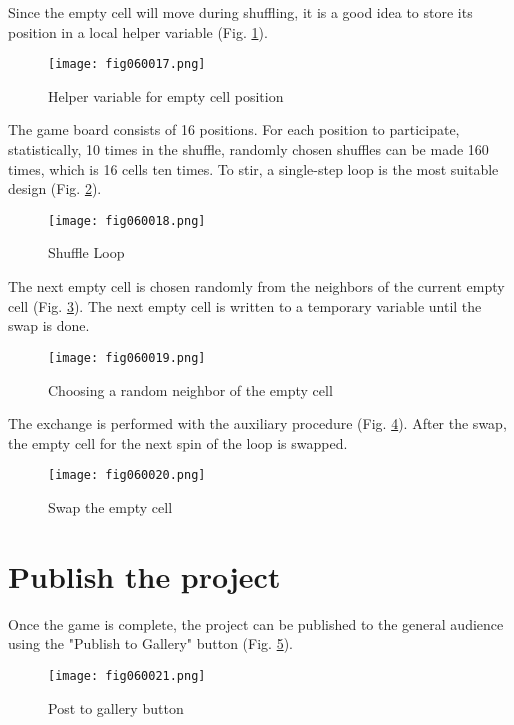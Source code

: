 Since the empty cell will move during shuffling, it is a good idea to store its position in a local helper variable (Fig. \ref{fig060017}).

\begin{figure}[H]
   \centering
   \texttt{[image: fig060017.png]}
   \caption{Helper variable for empty cell position}
\label{fig060017}
\end{figure}

The game board consists of 16 positions. For each position to participate, statistically, 10 times in the shuffle, randomly chosen shuffles can be made 160 times, which is 16 cells ten times. To stir, a single-step loop is the most suitable design (Fig. \ref{fig060018}).

\begin{figure}[H]
   \centering
   \texttt{[image: fig060018.png]}
   \caption{Shuffle Loop}
\label{fig060018}
\end{figure}

The next empty cell is chosen randomly from the neighbors of the current empty cell (Fig. \ref{fig060019}). The next empty cell is written to a temporary variable until the swap is done.

\begin{figure}[H]
   \centering
   \texttt{[image: fig060019.png]}
   \caption{Choosing a random neighbor of the empty cell}
\label{fig060019}
\end{figure}

The exchange is performed with the auxiliary procedure (Fig. \ref{fig060020}). After the swap, the empty cell for the next spin of the loop is swapped.

\begin{figure}[H]
   \centering
   \texttt{[image: fig060020.png]}
   \caption{Swap the empty cell}
\label{fig060020}
\end{figure}

\section{Publish the project}

Once the game is complete, the project can be published to the general audience using the "Publish to Gallery" button (Fig. \ref{fig060021}).

\begin{figure}[H]
   \centering
   \texttt{[image: fig060021.png]}
   \caption{Post to gallery button}
\label{fig060021}
\end{figure}

